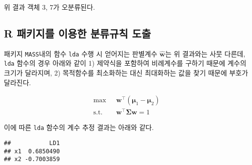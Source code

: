 \documentclass[
]{book}
\newenvironment{Shaded}{\begin{snugshade}}{\end{snugshade}}
\newcommand{\FunctionTok}[1]{\textcolor[rgb]{0.00,0.00,0.00}{#1}}
\newcommand{\NormalTok}[1]{#1}
\newcommand{\OtherTok}[1]{\textcolor[rgb]{0.56,0.35,0.01}{#1}}
\newcommand{\SpecialCharTok}[1]{\textcolor[rgb]{0.00,0.00,0.00}{#1}}
\begin{document}
위 결과 객체 3, 7가 오분류된다.

\hypertarget{r-uxd328uxd0a4uxc9c0uxb97c-uxc774uxc6a9uxd55c-uxbd84uxb958uxaddcuxce59-uxb3c4uxcd9c}{%
\subsection{R 패키지를 이용한 분류규칙 도출}\label{r-uxd328uxd0a4uxc9c0uxb97c-uxc774uxc6a9uxd55c-uxbd84uxb958uxaddcuxce59-uxb3c4uxcd9c}}

패키지 \texttt{MASS}내의 함수 \texttt{lda} 수행 시 얻어지는 판별계수 \(\hat{\mathbf{w}}\)는 위 결과와는 사뭇 다른데, \texttt{lda} 함수의 경우 아래와 같이 1) 제약식을 포함하여 비례계수를 구하기 때문에 계수의 크기가 달라지며, 2) 목적함수를 최소화하는 대신 최대화하는 값을 찾기 때문에 부호가 달라진다.

\begin{equation*}
\begin{split}
\max \text{  } & \mathbf{w}^\top ( \boldsymbol\mu_1 - \boldsymbol\mu_2 )\\
\text{s.t. } & \mathbf{w}^\top \boldsymbol\Sigma \mathbf{w} = 1
\end{split}
\end{equation*}

이에 따른 \texttt{lda} 함수의 계수 추정 결과는 아래와 같다.

\begin{Shaded}
\end{Shaded}

\begin{verbatim}
##           LD1
## x1  0.6850490
## x2 -0.7003859
\end{verbatim}

\begin{Shaded}
\end{Shaded}
\end{document}
